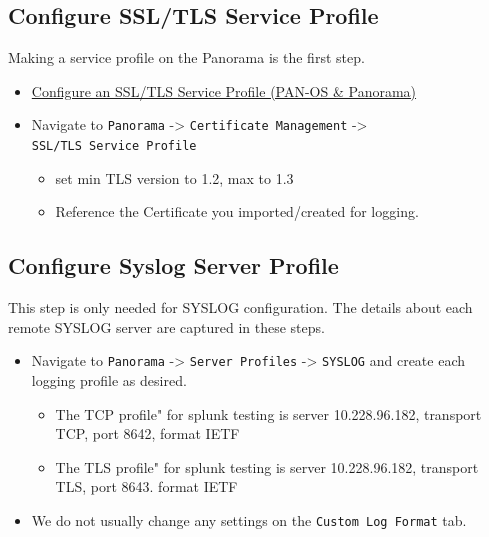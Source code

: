 \documentclass[
  english,
  twoside]{article}
\providecommand{\tightlist}{%
  \setlength{\itemsep}{0pt}\setlength{\parskip}{0pt}}
\begin{document}
\hypertarget{configure-ssltls-service-profile}{%
\subsection{Configure SSL/TLS Service
Profile}\label{configure-ssltls-service-profile}}

Making a service profile on the Panorama is the first step.

\begin{itemize}
\tightlist
\item
  \href{https://docs.paloaltonetworks.com/pan-os/11-1/pan-os-admin/certificate-management/configure-an-ssltls-service-profile/configure-an-ssltls-service-profile-pan-os}{Configure
  an SSL/TLS Service Profile (PAN-OS \& Panorama)}
\item
  Navigate to \texttt{Panorama} -\textgreater{}
  \texttt{Certificate\ Management} -\textgreater{}
  \texttt{SSL/TLS\ Service\ Profile}

  \begin{itemize}
  \tightlist
  \item
    set min TLS version to 1.2, max to 1.3
  \item
    Reference the Certificate you imported/created for logging.
  \end{itemize}
\end{itemize}

\hypertarget{configure-syslog-server-profile}{%
\subsection{Configure Syslog Server
Profile}\label{configure-syslog-server-profile}}

This step is only needed for SYSLOG configuration. The details about
each remote SYSLOG server are captured in these steps.

\begin{itemize}
\tightlist
\item
  Navigate to \texttt{Panorama} -\textgreater{}
  \texttt{Server\ Profiles} -\textgreater{} \texttt{SYSLOG} and create
  each logging profile as desired.

  \begin{itemize}
  \tightlist
  \item
    The TCP profile" for splunk testing is server 10.228.96.182,
    transport TCP, port 8642, format IETF
  \item
    The TLS profile" for splunk testing is server 10.228.96.182,
    transport TLS, port 8643. format IETF
  \end{itemize}
\item
  We do not usually change any settings on the
  \texttt{Custom\ Log\ Format} tab.
\end{itemize}
\end{document}
